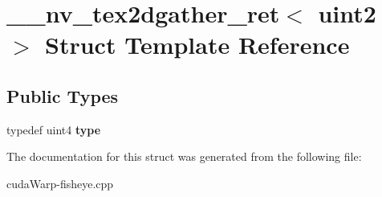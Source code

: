 \hypertarget{struct____nv__tex2dgather__ret_3_01uint2_01_4}{}\section{\+\_\+\+\_\+nv\+\_\+tex2dgather\+\_\+ret$<$ uint2 $>$ Struct Template Reference}
\label{struct____nv__tex2dgather__ret_3_01uint2_01_4}
\subsection*{Public Types}
\begin{DoxyCompactItemize}
\item 
typedef uint4 {\bfseries type}\hypertarget{struct____nv__tex2dgather__ret_3_01uint2_01_4_abceda38f65261fc987c0e46ac2211749}{}\label{struct____nv__tex2dgather__ret_3_01uint2_01_4_abceda38f65261fc987c0e46ac2211749}

\end{DoxyCompactItemize}


The documentation for this struct was generated from the following file\+:\begin{DoxyCompactItemize}
\item 
cuda\+Warp-\/fisheye.\+cpp\end{DoxyCompactItemize}
